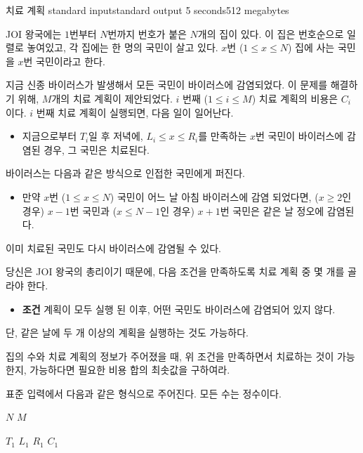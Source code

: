 \begin{problem}{치료 계획}
	{standard input}{standard output}
	{5 seconds}{512 megabytes}{}
	
	JOI 왕국에는 $1$번부터 $N$번까지 번호가 붙은 $N$개의 집이 있다. 이 집은 번호순으로 일렬로 놓여있고, 각 집에는 한 명의 국민이 살고 있다. $x$번 ($1 \le x \le N$) 집에 사는 국민을 $x$번 국민이라고 한다.
	
	지금 신종 바이러스가 발생해서 모든 국민이 바이러스에 감염되었다. 이 문제를 해결하기 위해, $M$개의 치료 계획이 제안되었다. $i$ 번째 ($1 \le i \le M$) 치료 계획의 비용은 $C_i$이다. $i$ 번째 치료 계획이 실행되면, 다음 일이 일어난다.
	
	\begin{itemize}
		\item[] 지금으로부터 $T_i$일 후 저녁에, $L_i \le x \le R_i$를 만족하는 $x$번 국민이 바이러스에 감염된 경우, 그 국민은 치료된다.
	\end{itemize}

	바이러스는 다음과 같은 방식으로 인접한 국민에게 퍼진다.
	
	\begin{itemize}
		
		\item[] 만약 $x$번 ($1 \le x \le N$) 국민이 어느 날 아침 바이러스에 감염 되었다면, ($x \ge 2$인 경우) $x-1$번 국민과 ($x\le N-1$인 경우) $x+1$번 국민은 같은 날 정오에 감염된다.
	\end{itemize}

	이미 치료된 국민도 다시 바이러스에 감염될 수 있다.
	
	당신은 JOI 왕국의 총리이기 때문에, 다음 조건을 만족하도록 치료 계획 중 몇 개를 골라야 한다.
	
	\begin{itemize}
		\item[] \textbf{조건} 계획이 모두 실행 된 이후, 어떤 국민도 바이러스에 감염되어 있지 않다.
	\end{itemize}

	단, 같은 날에 두 개 이상의 계획을 실행하는 것도 가능하다.
	
	집의 수와 치료 계획의 정보가 주어졌을 때, 위 조건을 만족하면서 치료하는 것이 가능한지, 가능하다면 필요한 비용 합의 최솟값을 구하여라.
	
	
	
	\InputFile
	
	표준 입력에서 다음과 같은 형식으로 주어진다. 모든 수는 정수이다.
	
	$N$ $M$ 
	
	$T_1$ $L_1$ $R_1$ $C_1$
	

\end{problem}
